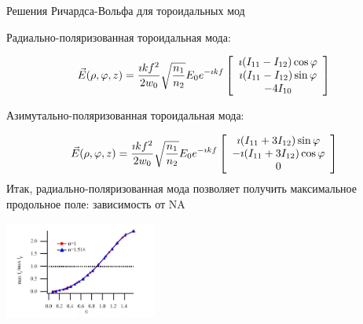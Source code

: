 \documentclass[9pt, compress, xcolor=table]{beamer}
\begin{document}
\begin{frame}{Решения Ричардса-Вольфа для тороидальных мод}

Радиально-поляризованная тороидальная мода:

\begin{equation*}
\begin{gathered}
\vec E(\rho, \varphi, z) = \frac{\imath k f^2}{2w_0} \sqrt
{\frac{n_1}{n_2}}E_0 e^{-\imath k f} \left[\array{c} \imath
(I_{11}-I_{12}) \cos \varphi \\  \imath (I_{11}-I_{12}) \sin
\varphi \\ -4 I_{10} \endarray\right]
\end{gathered}
\end{equation*}

Азимутально-поляризованная тороидальная мода:

\begin{equation*}
\begin{gathered}
\vec E(\rho, \varphi, z) = \frac{\imath k f^2}{2w_0} \sqrt
{\frac{n_1}{n_2}}E_0 e^{-\imath k f} \left[\array{c} \imath
(I_{11}+3 I_{12}) \sin \varphi \\ - \imath (I_{11}+ 3 I_{12})
\cos \varphi \\ 0 \endarray\right]
\end{gathered}
\end{equation*}
Итак, радиально-поляризованная мода позволяет получить максимальное продольное поле: зависимость от NA
\begin{center}
\includegraphics[width=5cm]{fig3_19}
\end{center}

\end{frame}
\end{document}
